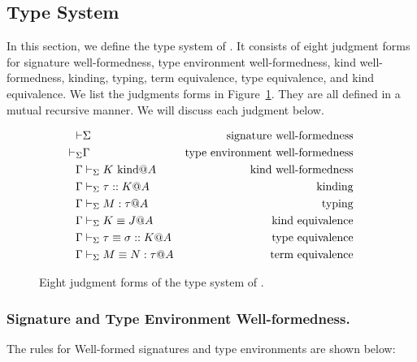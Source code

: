 
\subsection{Type System}

In this section, we define the type system of \LMD.
It consists of eight judgment forms for signature well-formedness, type environment well-formedness, kind well-formedness, kinding, typing, term equivalence, type equivalence, and kind equivalence.
We list the judgments forms in Figure~\ref{fig:LMD-six-judgments}.
They are all defined in a mutual recursive manner.  We will discuss
each judgment below.

\begin{figure}
  \begin{center}
    \begin{align*}
      \vdash & \Sigma                     & \text{signature well-formedness}        \\
      \vdash_\Sigma     & \Gamma                         & \text{type environment well-formedness} \\
      \Gamma     & \vdash_\Sigma K \text{\ kind} @ A           & \text{kind well-formedness}             \\
      \Gamma     & \vdash_\Sigma \tau :: K @ A           & \text{kinding}                          \\
      \Gamma     & \vdash_\Sigma M : \tau @ A            & \text{typing}                           \\
      \Gamma     & \vdash_\Sigma K \equiv J @ A              & \text{kind equivalence}                 \\
      \Gamma     & \vdash_\Sigma \tau \equiv \sigma :: K @ A & \text{type equivalence}                 \\
      \Gamma     & \vdash_\Sigma M \equiv N : \tau @ A       & \text{term equivalence}
    \end{align*}
    \caption{Eight judgment forms of the type system of \LMD.}
    \label{fig:LMD-six-judgments}
  \end{center}
\end{figure}


\subsubsection{Signature and Type Environment Well-formedness.}
The rules for Well-formed signatures and type environments are
shown below:
%
{\small
\begin{center}
  \infrule{
  }{
    \vdash \emptyset
  }
  \hfil
  \hfil
  \\[2mm]
  \infrule{
  }{
    \V \emptyset
  }
  \hfil
\end{center}
}

